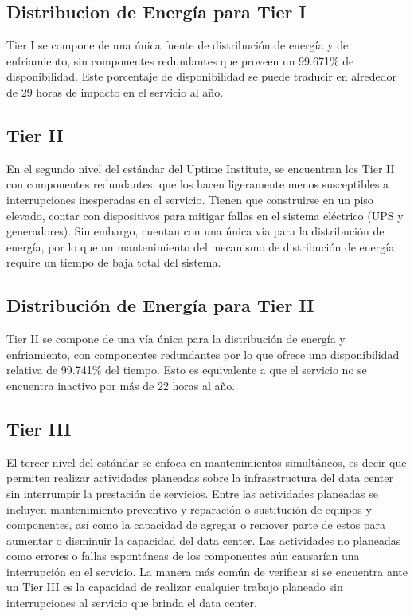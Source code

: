 \documentclass[journal]{IEEEtran}
\begin{document}
\subsection{Distribucion de Energía para Tier I}
Tier I se compone de una única fuente de distribución de energía y de enfriamiento, sin componentes redundantes que proveen un 99.671\% de disponibilidad\cite{pitt_turner}.
Este porcentaje de disponibilidad se puede traducir en alrededor de 29 horas de impacto en el servicio al año.
\subsection{Tier II}
En el segundo nivel del estándar del Uptime Institute, se encuentran los Tier II con componentes redundantes, que los hacen ligeramente menos susceptibles a interrupciones inesperadas en el servicio.
Tienen que construirse en un piso elevado, contar con dispositivos para mitigar fallas en el sistema eléctrico (UPS y generadores). Sin embargo, cuentan con una única vía para la distribución de energía,
por lo que un mantenimiento del mecanismo de distribución de energía require un tiempo de baja total del sistema.
\subsection{Distribución de Energía para Tier II}
Tier II se compone de una vía única para la distribución de energía y enfriamiento, con componentes redundantes por lo que ofrece una disponibilidad relativa de 99.741\% del tiempo. Esto es equivalente a 
que el servicio no se encuentra inactivo por más de 22 horas al año.
\subsection{Tier III}
El tercer nivel del estándar se enfoca en mantenimientos simultáneos, es decir que permiten realizar actividades planeadas sobre la infraestructura del data center sin interrumpir la prestación de servicios.
Entre las actividades planeadas se incluyen mantenimiento preventivo y reparación o sustitución de equipos y componentes, así como la capacidad de agregar o remover parte de estos para aumentar o disminuir la capacidad
del data center. 
Las actividades no planeadas como errores o fallas espontáneas de los componentes aún causarían una interrupción en el servicio. La manera más común de verificar si se encuentra ante un Tier III es la capacidad de realizar cualquier
trabajo planeado sin interrupciones al servicio que brinda el data center.
\end{document}
